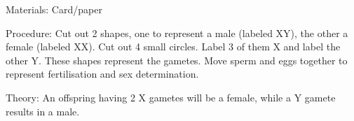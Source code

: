 \begin{multicols}{2}
\begin{description*}
\item[Materials:]{Card/paper}
\item[Procedure:]{Cut out 2 shapes, one to
represent a male (labeled XY), the
other a female (labeled XX). Cut
out 4 small circles. Label 3 of
them X and label the other Y.
These shapes represent the
gametes. Move sperm and eggs
together to represent fertilisation
and sex determination.}
\item[Theory:]{An offspring having 2 X gametes will be a female, while a Y gamete results in a male.}
\end{description*}


%
%
%
%



\end{multicols}

\pagebreak